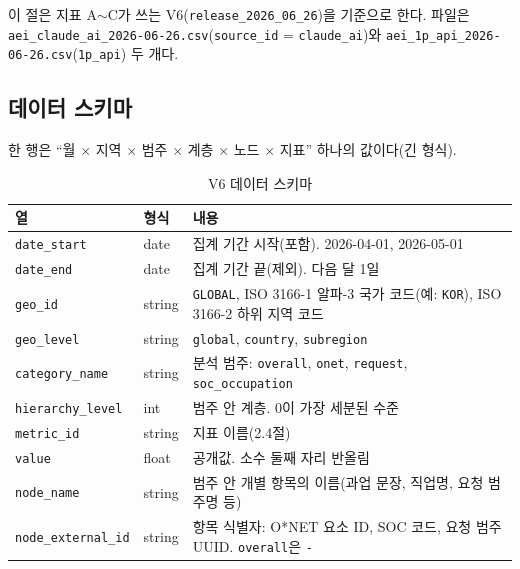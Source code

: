 \documentclass[11pt]{article}
\begin{document}
이 절은 지표 A$\sim$C가 쓰는 V6(\texttt{release\_2026\_06\_26})을 기준으로 한다. 파일은 \texttt{aei\_claude\_ai\_2026-06-26.csv}(\texttt{source\_id} = \texttt{claude\_ai})와 \texttt{aei\_1p\_api\_2026-06-26.csv}(\texttt{1p\_api}) 두 개다.

\subsection{데이터 스키마}

한 행은 ``월 $\times$ 지역 $\times$ 범주 $\times$ 계층 $\times$ 노드 $\times$ 지표'' 하나의 값이다(긴 형식).

\begin{longtable}{L{3.6cm}L{1.6cm}L{11.4cm}}
\caption{V6 데이터 스키마}\label{tab:schema}\\
\toprule
열 & 형식 & 내용 \\
\midrule
\endfirsthead
\texttt{date\_start} & date & 집계 기간 시작(포함). 2026-04-01, 2026-05-01 \\
\texttt{date\_end} & date & 집계 기간 끝(제외). 다음 달 1일 \\
\texttt{geo\_id} & string & \texttt{GLOBAL}, ISO 3166-1 알파-3 국가 코드(예: \texttt{KOR}), ISO 3166-2 하위 지역 코드 \\
\texttt{geo\_level} & string & \texttt{global}, \texttt{country}, \texttt{subregion} \\
\texttt{category\_name} & string & 분석 범주: \texttt{overall}, \texttt{onet}, \texttt{request}, \texttt{soc\_occupation} \\
\texttt{hierarchy\_level} & int & 범주 안 계층. 0이 가장 세분된 수준 \\
\texttt{metric\_id} & string & 지표 이름(2.4절) \\
\texttt{value} & float & 공개값. 소수 둘째 자리 반올림 \\
\texttt{node\_name} & string & 범주 안 개별 항목의 이름(과업 문장, 직업명, 요청 범주명 등) \\
\texttt{node\_external\_id} & string & 항목 식별자: O*NET 요소 ID, SOC 코드, 요청 범주 UUID. \texttt{overall}은 \texttt{-} \\
\bottomrule
\end{longtable}
\end{document}
